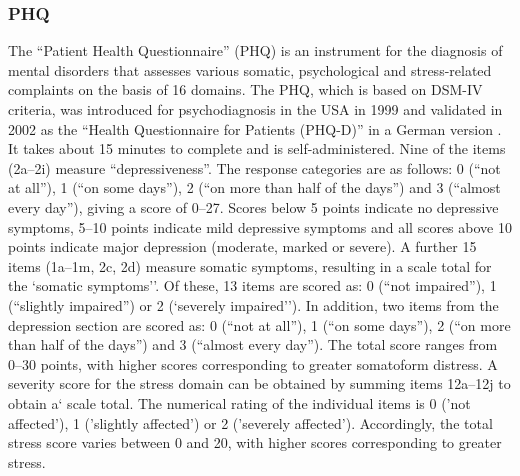 \subsubsection{\acl{PHQ}}
\label{questionnaires:PHQ}
The ``Patient Health Questionnaire'' (\acs{PHQ}) is an instrument for the diagnosis of mental disorders that assesses various somatic, psychological and stress-related complaints on the basis of 16 domains. The \acs{PHQ}, which is based on DSM-IV criteria, was introduced for psychodiagnosis in the USA in 1999 \cite{spitzer1999phq} and validated in 2002 as the ``Health Questionnaire for Patients (PHQ-D)'' in a German version \cite{lowe2002phq}. It takes about 15 minutes to complete and is self-administered. Nine of the items (2a--2i) measure ``depressiveness''. The response categories are as follows: 0 (``not at all''), 1 (``on some days''), 2 (``on more than half of the days'') and 3 (``almost every day''), giving a score of 0--27. Scores below 5 points indicate no depressive symptoms, 5--10 points indicate mild depressive symptoms and all scores above 10 points indicate major depression (moderate, marked or severe). A further 15 items (1a--1m, 2c, 2d) measure somatic symptoms, resulting in a scale total for the `somatic symptoms''. Of these, 13 items are scored as: 0 (``not impaired''), 1 (``slightly impaired'') or 2 (`severely impaired''). In addition, two items from the depression section are scored as: 0 (``not at all''), 1 (``on some days''), 2 (``on more than half of the days'') and 3 (``almost every day''). The total score ranges from 0--30 points, with higher scores corresponding to greater somatoform distress. 
A severity score for the stress domain can be obtained by summing items 12a--12j to obtain a` scale total. The numerical rating of the individual items is 0 ('not affected'), 1 ('slightly affected') or 2 ('severely affected'). Accordingly, the total stress score varies between 0 and 20, with higher scores corresponding to greater stress.

